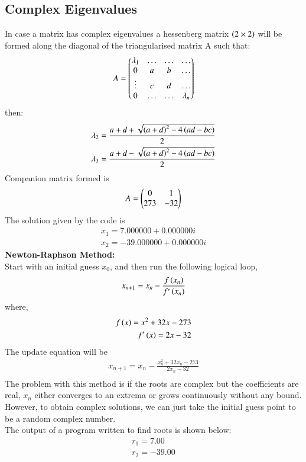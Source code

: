 \documentclass[journal,12pt,onecolumn]{IEEEtran}
\theoremstyle{remark}
\begin{document}
\subsection{Complex Eigenvalues}
In case a matrix has complex eigenvalues a hessenberg matrix $\left(2\times2\right)$ will be formed along the diagonal of the triangularised matrix A such that:
$$A=\begin{pmatrix}\lambda_1 & \dots & \dots & \dots \\ 0 & a & b & \dots\\ \vdots & c & d & \dots\\ 0 & \dots & \dots & \lambda_n\end{pmatrix}$$
then:
\begin{align}
    \lambda_2=\frac{a+d+\sqrt{\left(a+d\right)^2-4\left(ad-bc\right)}}{2}\\
    \lambda_3=\frac{a+d-\sqrt{\left(a+d\right)^2-4\left(ad-bc\right)}}{2}\\
\end{align}
Companion matrix formed is
\begin{align}
    A=\begin{pmatrix}0&1\\273&-32\end{pmatrix}
\end{align}
The solution given by the code is
\begin{align}
	x_1=7.000000 + 0.000000i\\
    x_2=-39.000000 + 0.000000i
\end{align}
\textbf{Newton-Raphson Method:}\\
Start with an initial guess $x_0$, and then run the following logical loop,
\begin{align}
    x_{n+1} = x_n - \frac{f\left(x_n\right)}{f^{\prime}\left(x_n\right)} 
\end{align}
where,
\begin{align}
    f\left(x\right) = x^2 + 32x - 273\\
    f^{\prime}\left(x\right) = 2x-32
\end{align}
The update equation will be
\begin{align}
	x_{n+1} = x_n - \frac{x_n^2 + 32x_n - 273}{2x_n-32}\\
\end{align}
The problem with this method is if the roots are complex but the coefficients are real, $x_n$ either converges to an extrema or grows continuously without any bound.
However, to obtain complex solutions, we can just take the initial guess point to be a
random complex number.\\
The output of a program written to find roots is shown below:
\begin{align}
	r_1 = 7.00\\
	r_2 = -39.00
\end{align}
\end{document}
